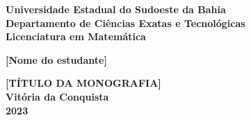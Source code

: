 \begin{titlepage}
  \begin{center}
    \textbf{\Large Universidade Estadual do Sudoeste da Bahia} \\
    
    \textbf{\Large Departamento de Ci\^encias Exatas e Tecnol\'ogicas}\\

    \vspace{3cm}
		\textbf{\Large Licenciatura em Matem\'atica\\} 	

    \vspace{3cm}
		\textbf{\Large [Nome do estudante]\\} 
  
    \vspace{5cm}
		\textbf{\Large [TÍTULO DA MONOGRAFIA]}\\
    \vfill
		\textbf{\Large Vit\'oria da Conquista\\2023}
  \end{center}
\end{titlepage}